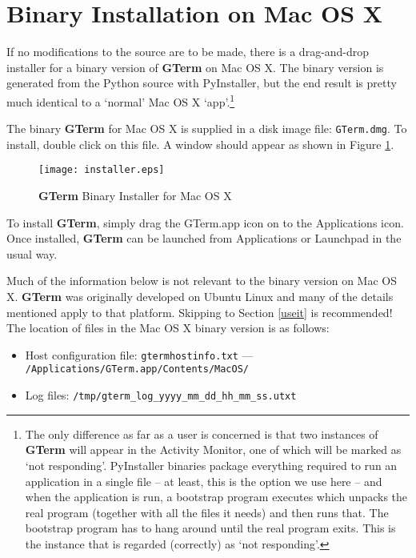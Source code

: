 \documentclass[a4paper,twoside,11pt]{article}
\makeatletter
\def\maxwidth{%
  \ifdim\Gin@nat@width>\linewidth
    \linewidth
  \else
    \Gin@nat@width
  \fi
}
\newcommand{\newpara}{\par\vspace{4mm}\noindent}
\newcommand{\textbfc}[1]{\textcolor{OurRed}{#1}}
\makeatother
\begin{document}
\section{Binary Installation on Mac OS X}
If no modifications to the source are to be made, there is a drag-and-drop installer for a binary version
of \textbf{GTerm} on Mac OS X. The binary version is generated from the Python source with PyInstaller, but the
end result is pretty much identical to a `normal' Mac OS X `app'.\footnote{The only difference as far as a user
is concerned is that  two instances of \textbf{GTerm} will appear in the Activity Monitor, one of which will be marked
as `not responding'. PyInstaller binaries package everything required to run an application in a single file -- at
least, this is the option we use here -- and when the application is run, a bootstrap program executes which
unpacks the real program (together with all the files it needs) and then runs that. 
The bootstrap program has to hang around until the real program
exits. This is the instance that is regarded (correctly) as `not responding'.}
\newpara
The binary \textbf{GTerm} for Mac OS X is supplied in a disk image file: \texttt{GTerm.dmg}. To install, double click
on this file. A window should appear as shown in Figure \ref{fig:inst}.
\begin{figure}
	\centering
		\texttt{[image: installer.eps]}
	\caption{\textbf{GTerm} Binary Installer for Mac OS X}
	\label{fig:inst}
\end{figure}
\newpara
To install \textbf{GTerm}, simply drag the GTerm.app icon on to the Applications icon. Once installed, \textbf{GTerm} can be launched
from Applications or Launchpad in the usual way.
\newpara
Much of the information below is not relevant to the binary version on Mac OS X. \textbf{GTerm} was originally developed
on Ubuntu Linux and many of the details mentioned apply to that platform. \textbfc{Skipping to Section} \ref{useit} \textbfc{is recommended!}
The location of files in the Mac OS X binary version is as follows:
\begin{itemize}
\item Host configuration file: \texttt{gtermhostinfo.txt} --- \texttt{/Applications/GTerm.app/Contents/MacOS/}
\item Log files: \texttt{/tmp/gterm\_log\_yyyy\_mm\_dd\_hh\_mm\_ss.utxt}
\end{itemize}
\end{document}
